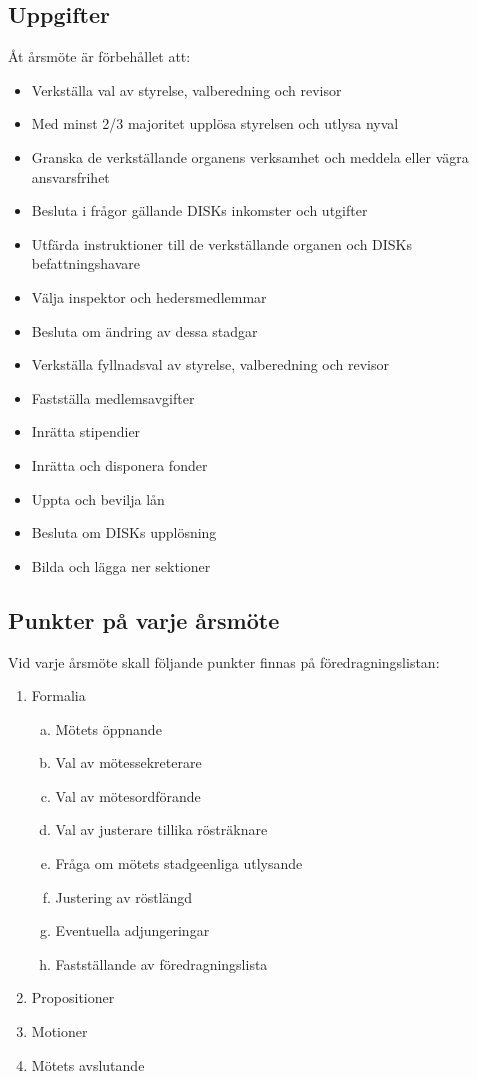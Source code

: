 	\subsection{Uppgifter}
	\label{subsec:uppgifter}
		Åt årsmöte är förbehållet att:
		\begin{itemize}
		\setlength{\itemsep}{0.0cm}
		\setlength{\parskip}{0.0cm}
			\item Verkställa val av styrelse, valberedning och revisor
			\item Med minst 2/3 majoritet upplösa styrelsen och utlysa nyval
			\item Granska de verkställande organens verksamhet och meddela eller vägra ansvarsfrihet
			\item Besluta i frågor gällande DISKs inkomster och utgifter
			\item Utfärda instruktioner till de verkställande organen och DISKs befattningshavare
			\item Välja inspektor och hedersmedlemmar
			\item Besluta om ändring av dessa stadgar
			\item Verkställa fyllnadsval av styrelse, valberedning och revisor
			\item Fastställa medlemsavgifter
			\item Inrätta stipendier
			\item Inrätta och disponera fonder
			\item Uppta och bevilja lån
			\item Besluta om DISKs upplösning
			\item Bilda och lägga ner sektioner
		\end{itemize}

\clearpage
	\subsection{Punkter på varje årsmöte}
	\label{subsec:punkterpavarjearsmote}
		Vid varje årsmöte skall följande punkter finnas på föredragningslistan:
		\begin{enumerate}[1.]
		\setlength{\itemsep}{0.0cm}
		\setlength{\parskip}{0.0cm}
			\item Formalia
			\begin{enumerate}[a.]
			\setlength{\itemsep}{0.0cm}
			\setlength{\parskip}{0.0cm}
				\item Mötets öppnande
				\item Val av mötessekreterare
				\item Val av mötesordförande
				\item Val av justerare tillika rösträknare
				\item Fråga om mötets stadgeenliga utlysande
				\item Justering av röstlängd
				\item Eventuella adjungeringar
				\item Fastställande av föredragningslista
			\end{enumerate}
			\item Propositioner
			\item Motioner
		\setcounter{enumi}{6}
			\item Mötets avslutande
		\end{enumerate}

